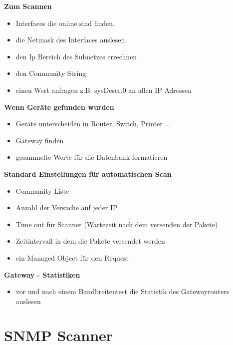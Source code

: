\documentclass[11pt,a4paper]{article}
\begin{document}
\textbf{Zum Scannen}
\begin{itemize}
\item Interfaces die online sind finden.
\item die Netmask des Interfaces auslesen.
\item den Ip Bereich des Subnetzes errechnen
\item den Community String
\item einen Wert anfragen z.B. sysDescr.0 an allen IP Adressen
\end{itemize}

\textbf{Wenn Geräte gefunden wurden}
\begin{itemize}
\item Geräte unterscheiden in Router, Switch, Printer ...
\item Gateway finden
\item gesammelte Werte für die Datenbank formatieren
\end{itemize}
\emptyline

\textbf{Standard Einstellungen für automatischen Scan}
\begin{itemize}
\item Community Liste
\item Anzahl der Versuche auf jeder IP
\item Time out für Scanner (Wartezeit nach dem versenden der Pakete)
\item Zeitintervall in dem die Pakete versendet werden
\item ein Managed Object für den Request
\end{itemize}
\emptyline

\textbf{Gateway - Statistiken}
\begin{itemize}
\item vor und nach einem Bandbreitentest die Statistik des Gatewayrouters auslesen
\end{itemize}

\section{SNMP Scanner}
\end{document}
